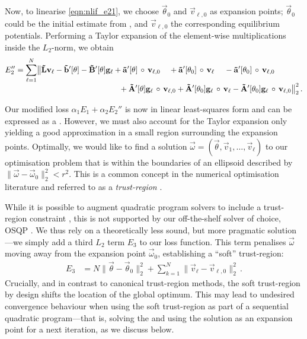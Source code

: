 Now, to linearise \cref{eqn:nlif_e21}, we choose $\vec \theta_0$ and $\vec v_{\ell, 0}$ as expansion points; $\vec \theta_0$ could be the initial estimate from , and $\vec v_{\ell, 0}$ the corresponding equilibrium potentials.
Performing a Taylor expansion of the element-wise multiplications inside the $L_2$-norm, we obtain
\begin{align}
	\begin{aligned}
	E_2'' &= \sum_{\ell = 1}^N
	\bigl\|
		  \mrL \vec v_\ell
	    - \vrbp[\vec \theta]
		- \mrBp[\vec \theta] \vec g_\ell
	    + \vrap[\vec \theta] \, \circ \, \vec v_{\ell, 0} \hspace{1.1em}
	    + \vrap[\vec \theta_0] \, \circ \, \vec v_{\ell} \hspace{1.1em}\,
	    - \vrap[\vec \theta_0] \, \circ \, \vec v_{\ell, 0} \\[-0.33em]
	&\hspace{4.675cm}
		+ \mrAp[\vec \theta] \vec g_\ell \, \circ \, \vec v_{\ell, 0}
		+ \mrAp[\vec \theta_0] \vec g_\ell \, \circ \, \vec v_{\ell}
		- \mrAp[\vec \theta_0] \vec g_\ell \, \circ \, \vec v_{\ell, 0}
	\bigr\|_2^2 \,.
	\end{aligned}
\end{align}

Our modified loss $\alpha_1 E_1 + \alpha_2 E_2''$ is now in linear least-squares form and can be expressed as a \QP.
However, we must also account for the Taylor expansion only yielding a good approximation in a small region surrounding the expansion points.
Optimally, we would like to find a solution $\vec \omega = (\vec \theta, \vec v_1, \ldots, \vec v_\ell)$ to our optimisation problem that is within the boundaries of an ellipsoid described by $\| \vec \omega - \vec \omega_0 \|_2^2 < r^2$.
This is a common concept in the numerical optimisation literature and referred to as a \emph{trust-region} \citep[Chapter~4]{nocedal2006numerical}.

While it is possible to augment quadratic program solvers to include a trust-region constraint \citep[Chapter~18]{nocedal2006numerical}, this is not supported by our off-the-shelf \QP solver of choice, OSQP \citep{stellato2020osqp}.
We thus rely on a theoretically less sound, but more pragmatic solution---we simply add a third $L_2$ term $E_3$ to our loss function.
This term penalises $\vec \omega$ moving away from the expansion point $\vec \omega_0$, establishing a \enquote{soft} trust-region:
\begin{align}
	E_3 &= N \| \vec \theta - \vec \theta_0 \|_2^2 + \sum_{k=1}^N \| \vec v_\ell - \vec v_{\ell, 0} \|_2^2 \,.
	\label{eqn:nlif_e3}
\end{align}
Crucially, and in contrast to canonical trust-region methods, the soft trust-region by design shifts the location of the global optimum.
This may lead to undesired convergence behaviour when using the soft trust-region as part of a sequential quadratic program---that is, solving the \QP and using the solution as an expansion point for a next iteration, as we discuss below.

